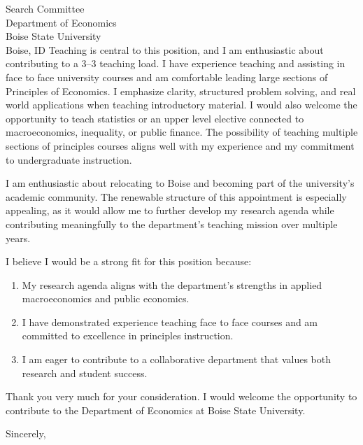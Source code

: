 \documentclass[11pt,letterpaper]{letter}
\begin{document}
\begin{letter}{
Search Committee \\
Department of Economics \\
Boise State University \\
Boise, ID
}
Teaching is central to this position, and I am enthusiastic about contributing to a 3–3 teaching load. I have experience teaching and assisting in face to face university courses and am comfortable leading large sections of Principles of Economics. I emphasize clarity, structured problem solving, and real world applications when teaching introductory material. I would also welcome the opportunity to teach statistics or an upper level elective connected to macroeconomics, inequality, or public finance. The possibility of teaching multiple sections of principles courses aligns well with my experience and my commitment to undergraduate instruction.

I am enthusiastic about relocating to Boise and becoming part of the university’s academic community. The renewable structure of this appointment is especially appealing, as it would allow me to further develop my research agenda while contributing meaningfully to the department’s teaching mission over multiple years.

I believe I would be a strong fit for this position because:
\begin{enumerate}
    \item My research agenda aligns with the department’s strengths in applied macroeconomics and public economics.
    \item I have demonstrated experience teaching face to face courses and am committed to excellence in principles instruction.
    \item I am eager to contribute to a collaborative department that values both research and student success.
\end{enumerate}

Thank you very much for your consideration. I would welcome the opportunity to contribute to the Department of Economics at Boise State University.

\closing{Sincerely,}

\end{letter}
\end{document}

